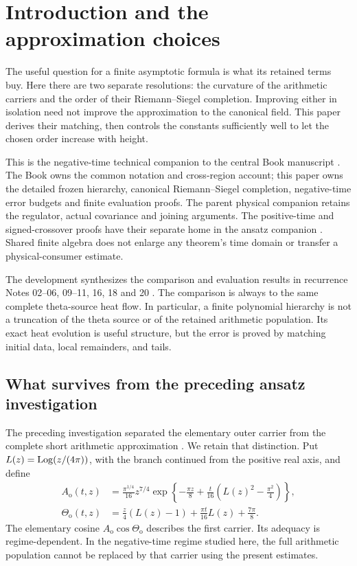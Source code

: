 \section{Introduction and the approximation choices}
\label{sec:intro}
The useful question for a finite asymptotic formula is what its
retained terms buy. Here there are two separate resolutions: the
curvature of the arithmetic carriers and the order of their
Riemann--Siegel completion. Improving either in isolation need not
improve the approximation to the canonical field. This paper derives
their matching, then controls the constants sufficiently well to let
the chosen order increase with height.

This is the negative-time technical companion to the central Book
manuscript \cite{bookcomp}. The Book owns the common notation and
cross-region account; this paper owns the detailed frozen hierarchy,
canonical Riemann--Siegel completion, negative-time error budgets and
finite evaluation proofs. The parent physical companion retains the
regulator, actual covariance and joining arguments. The positive-time
and signed-crossover proofs have their separate home in the ansatz
companion \cite{ansatzcomp}. Shared finite algebra does not enlarge
any theorem's time domain or transfer a physical-consumer estimate.

The development synthesizes the comparison and evaluation results in
recurrence Notes 02--06, 09--11, 16, 18 and 20
\cite{rec02,rec03,rec04,rec05,rec06,rec09,rec10,rec11,rec16,rec18,rec20}. The comparison is always to the
same complete theta-source heat flow. In particular, a finite
polynomial hierarchy is not a truncation of the theta source or
of the retained arithmetic population. Its exact heat evolution
is useful structure, but the error is proved by matching initial
data, local remainders, and tails.

\subsection{What survives from the preceding ansatz investigation}
\label{subsec:retention}
The preceding investigation separated the elementary outer carrier
from the complete short arithmetic approximation
\cite{ans03,ans04,ans05,ans10,ans12}. We retain that distinction.
Put \(L(z)=\operatorname{Log}(z/(4\pi))\), with the branch continued from the
positive real axis, and define
\begin{subequations}\label{eq:outer-arms}
\begin{align}
 A_{\mathrm o}(t,z)&=\frac{\pi^{1/4}}{16}z^{7/4}
 \exp\left\{-\frac{\pi z}{8}
       +\frac t{16}\left(L(z)^2-\frac{\pi^2}{4}\right)\right\},\\
 \Theta_{\mathrm o}(t,z)&=\frac z4(L(z)-1)
                  +\frac{\pi t}{16}L(z)+\frac{7\pi}{8}.
\end{align}
\end{subequations}
The elementary cosine \(A_{\mathrm o}\cos\Theta_{\mathrm o}\)
describes the first carrier. Its adequacy is regime-dependent.
In the negative-time regime studied here, the full arithmetic
population cannot be replaced by that carrier using the present
estimates.

